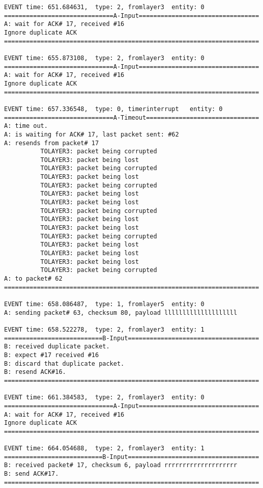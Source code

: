 \documentclass[12pt]{article}
\begin{document}
\begin{verbatim}
EVENT time: 651.684631,  type: 2, fromlayer3  entity: 0
==============================A-Input=================================
A: wait for ACK# 17, received #16
Ignore duplicate ACK
======================================================================

EVENT time: 655.873108,  type: 2, fromlayer3  entity: 0
==============================A-Input=================================
A: wait for ACK# 17, received #16
Ignore duplicate ACK
======================================================================

EVENT time: 657.336548,  type: 0, timerinterrupt   entity: 0
==============================A-Timeout===============================
A: time out. 
A: is waiting for ACK# 17, last packet sent: #62
A: resends from packet# 17 
          TOLAYER3: packet being corrupted
          TOLAYER3: packet being lost
          TOLAYER3: packet being corrupted
          TOLAYER3: packet being lost
          TOLAYER3: packet being corrupted
          TOLAYER3: packet being lost
          TOLAYER3: packet being lost
          TOLAYER3: packet being corrupted
          TOLAYER3: packet being lost
          TOLAYER3: packet being lost
          TOLAYER3: packet being corrupted
          TOLAYER3: packet being lost
          TOLAYER3: packet being lost
          TOLAYER3: packet being lost
          TOLAYER3: packet being corrupted
A: to packet# 62
======================================================================

EVENT time: 658.086487,  type: 1, fromlayer5  entity: 0
A: sending packet# 63, checksum 80, payload llllllllllllllllllll

EVENT time: 658.522278,  type: 2, fromlayer3  entity: 1
===========================B-Input====================================
B: received duplicate packet.
B: expect #17 received #16
B: discard that duplicate packet.
B: resend ACK#16.
======================================================================

EVENT time: 661.384583,  type: 2, fromlayer3  entity: 0
==============================A-Input=================================
A: wait for ACK# 17, received #16
Ignore duplicate ACK
======================================================================

EVENT time: 664.054688,  type: 2, fromlayer3  entity: 1
===========================B-Input====================================
B: received packet# 17, checksum 6, payload rrrrrrrrrrrrrrrrrrrr
B: send ACK#17.
======================================================================


\end{verbatim}
\end{document}
